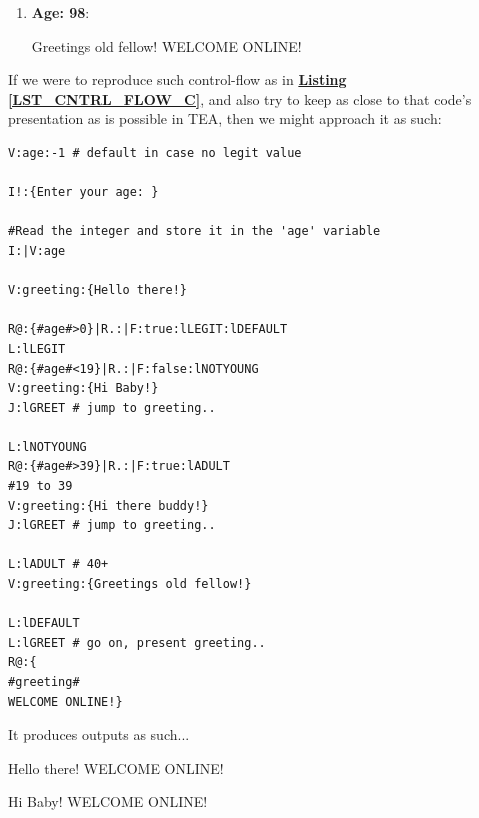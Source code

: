 \documentclass[a4paper, 18pt]{book} %
\begin{document}
{{{\begin{appendices}
\begin{enumerate}
    
  \item \textbf{Age: 98}:
  
   \begin{tcbverbatim}
Greetings old fellow!
WELCOME ONLINE!
    \end{tcbverbatim}

\end{enumerate}


If we were to reproduce such control-flow as in \textbf{\hyperref[LST_CNTRL_FLOW_C]{Listing \ref{LST_CNTRL_FLOW_C}}}, and also try to keep as close to that code's presentation as is possible in TEA, then we might approach it as such:



\vspace{2em}

  \begin{tcolorbox}[teaterminalstyle, title=TEA Control Flow: Age-Group Greeting Case, breakable]
  \begin{lstlisting}[language=TEA,breaklines=true,]
V:age:-1 # default in case no legit value

I!:{Enter your age: }
    
#Read the integer and store it in the 'age' variable
I:|V:age

V:greeting:{Hello there!}

R@:{#age#>0}|R.:|F:true:lLEGIT:lDEFAULT
L:lLEGIT
R@:{#age#<19}|R.:|F:false:lNOTYOUNG
V:greeting:{Hi Baby!}
J:lGREET # jump to greeting..

L:lNOTYOUNG
R@:{#age#>39}|R.:|F:true:lADULT
#19 to 39
V:greeting:{Hi there buddy!}
J:lGREET # jump to greeting..

L:lADULT # 40+
V:greeting:{Greetings old fellow!}

L:lDEFAULT
L:lGREET # go on, present greeting..
R@:{
#greeting#
WELCOME ONLINE!}
   \end{lstlisting}
  \end{tcolorbox}

\vspace{2em}


It produces outputs as such...

 \begin{tcbverbatim}[title=No Valid Age]
Hello there!
WELCOME ONLINE!
  \end{tcbverbatim}
  
  \vspace{1em}
  
 \begin{tcbverbatim}[title=Age: 10]
Hi Baby!
WELCOME ONLINE!
  \end{tcbverbatim}
    

\end{appendices}}}}
\end{document}
